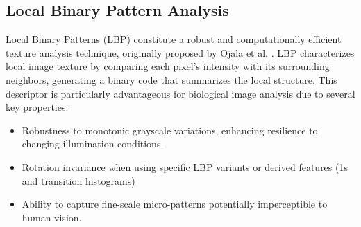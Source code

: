 \documentclass[a4paper,12pt]{report}
\begin{document}


    
    
    

\subsection{Local Binary Pattern Analysis}

Local Binary Patterns (LBP) constitute a robust and computationally efficient texture analysis technique, originally proposed by Ojala et al. . LBP characterizes local image texture by comparing each pixel's intensity with its surrounding neighbors, generating a binary code that summarizes the local structure. This descriptor is particularly advantageous for biological image analysis due to several key properties:

\begin{itemize}
    \item Robustness to monotonic grayscale variations, enhancing resilience to changing illumination conditions.
    \item Rotation invariance when using specific LBP variants or derived features (1s and transition histograms)
    \item Ability to capture fine-scale micro-patterns potentially imperceptible to human vision.
\end{itemize}
\end{document}
